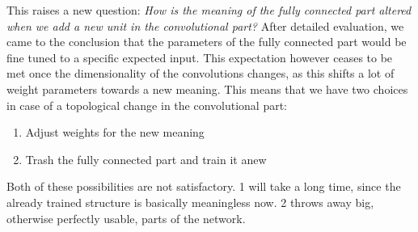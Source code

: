 This raises a new question: \emph{How is the meaning of the fully connected part altered when we add a new unit in the convolutional part?}  
After detailed evaluation, we came to the conclusion that the parameters of the fully connected part would be fine tuned to a specific expected input. This expectation however ceases to be met once the dimensionality of the convolutions changes, as this shifts a lot of weight parameters towards a new meaning.  
This means that we have two choices in case of a topological change in the convolutional part:
\begin{enumerate}
	\item{Adjust weights for the new meaning}
	\item{Trash the fully connected part and train it anew}
\end{enumerate}  
Both of these possibilities are not satisfactory. 1 will take a long time, since the already trained structure is basically meaningless now. 2 throws away big, otherwise perfectly usable, parts of the network.  

